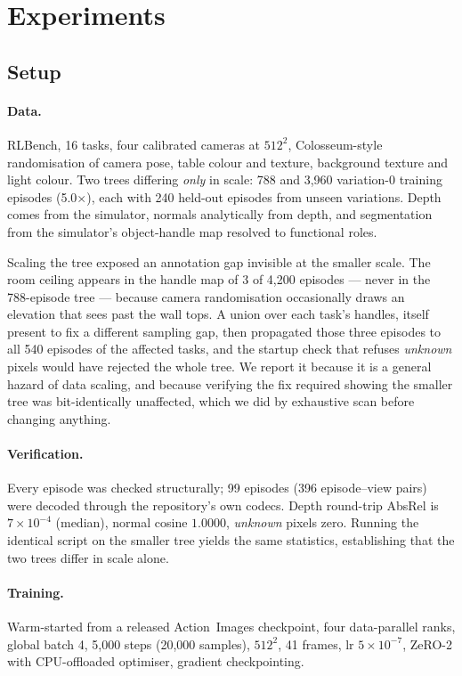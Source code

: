 \documentclass{article}
\begin{document}
\section{Experiments}
\label{sec:exp}

\subsection{Setup}
\label{sec:data}

\paragraph{Data.} RLBench, 16 tasks, four calibrated cameras at $512^2$, Colosseum-style
randomisation of camera pose, table colour and texture, background texture and light colour. Two
trees differing \emph{only} in scale: 788 and 3{,}960 variation-0 training episodes (5.0$\times$),
each with 240 held-out episodes from unseen variations. Depth comes from the simulator, normals
analytically from depth, and segmentation from the simulator's object-handle map resolved to
functional roles.

Scaling the tree exposed an annotation gap invisible at the smaller scale. The room ceiling
appears in the handle map of 3 of 4{,}200 episodes --- never in the 788-episode tree --- because
camera randomisation occasionally draws an elevation that sees past the wall tops. A union over
each task's handles, itself present to fix a different sampling gap, then propagated those three
episodes to all 540 episodes of the affected tasks, and the startup check that refuses
\emph{unknown} pixels would have rejected the whole tree. We report it because it is a
general hazard of data scaling, and because verifying the fix required showing the smaller tree
was bit-identically unaffected, which we did by exhaustive scan before changing anything.

\paragraph{Verification.} Every episode was checked structurally; 99 episodes (396
episode--view pairs) were decoded through the repository's own codecs. Depth round-trip AbsRel is
$7\times10^{-4}$ (median), normal cosine $1.0000$, \emph{unknown} pixels zero. Running the
identical script on the smaller tree yields the same statistics, establishing that the two trees
differ in scale alone.

\paragraph{Training.} Warm-started from a released Action~Images checkpoint, four data-parallel
ranks, global batch 4, 5{,}000 steps (20{,}000 samples), $512^2$, 41 frames, lr $5\times10^{-7}$,
ZeRO-2 with CPU-offloaded optimiser, gradient checkpointing.
\end{document}
